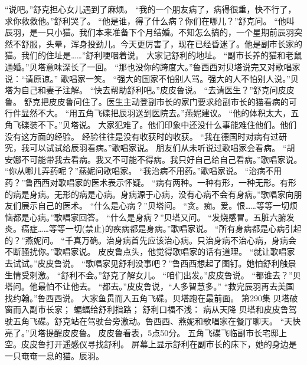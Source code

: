 \documentclass[a4paper,12pt,UTF8,twoside]{ctexbook}
\begin{document}
        “说吧。”舒克担心女儿遇到了麻烦。  
        “我的一个朋友病了，病得很重，快不行了，求你救救他。”舒利哭了。  
        “他是谁，得了什么病？你们在哪儿？”舒克问。  
        “他叫辰羽，是一只小猫。我们本来准备下个月结婚。不知怎么搞的，一个星期前辰羽突然不舒服，头晕，浑身投劲儿。今天更厉害了，现在已经昏迷了。他是副市长家的猫。我们的住址是……”舒利哽咽着说。  
        大家记舒利的地址。  
        “副市长养的猫和老鼠通婚。”贝塔意味深长了一回。  
        “那也没你的跨度大。”鲁西西对贝塔说完又对歌唱家说：“请原谅。”  
        歌唱家一笑。  
        “强大的国家不怕别人骂。强大的人不怕别人说。”贝塔为自己和妻子注解。  
        “快去帮助舒利吧。”皮皮鲁说。  
        “去请医生？”舒克问皮皮鲁。  
        舒克把皮皮鲁问住了。医生主动登副市长的家门要求给副市长的猫看病的可行件显然不大。  
        “用五角飞碟把辰羽送到医院去。”燕妮建议。  
        “他的体积太大，五角飞碟装不下。”贝塔说。  
        大家犯难了。他们印象中还没什么事能难住他们。他们没有这方面的经验。  
        经验往往是没有收获时的收获。  
        “我在德国时对病有过研究，我可以试试给辰羽看病。”歌唱家说。  
        朋友们从未听说过歌唱家会看病。  
        “胡安娜不可能带我去看病。我又不可能不得病。我只好自己给自己看病。”歌唱家说。  
        “你从哪儿弄药呢？”燕妮问歌唱家。  
        “我治病不用药。”歌唱家说。  
        “治病不用药？”鲁西西对歌唱家的医术表示怀疑。  
        “病有两种。一种有形，一种无形。有形的病是身病。无形的病是心病。身病源于心病，没有心病不会有身病。”歌唱家向朋友们展示自己的医术。  
        “什么是心病？”贝塔问。  
        “贪。痴。爱。恨……等等一切烦恼都是心病。”歌唱家回答。  
        “什么是身病？”贝塔又问。  
        “发烧感冒。五脏六腑发炎。癌症……等等一切(禁止)的疾病都是身病。”歌唱家说。        
        “所有身病都是心病引起的？”燕妮问。  
        “千真万确。治身病首先应该治心病。只治身病不治心病，身病会不断骚扰你。”歌唱家说。  
        皮皮鲁点头，他觉得歌唱家的话有道理。  
        “就让歌唱家去试试。”皮皮鲁说。  
        “歌唱家见舒利没事吧？”鲁西西想起了图钉。她怕舒利触景生情受刺激。  
        “舒利不会。”舒克了解女儿。  
        “咱们出发。”皮皮鲁说。  
        “都谁去？”贝塔问。他最怕不让他去。  
        “都去。”皮皮鲁说，“人多智慧多。”  
        “救完辰羽再去美国找约翰。”鲁西西说。  
        大家鱼贯而入五角飞碟。贝塔跑在最前面。          第290集  
        贝塔破窗而入副市长家；  
        蝙蝠给舒利指路；  
        舒利口福不浅：  
        病从天降    
        贝塔和皮皮鲁驾驶五角飞碟。舒克站在驾驶台旁激动。鲁西西、燕妮和歌唱家在餐厅聊天。  
        “天快亮了。”贝塔提醒皮皮鲁。  
        皮皮鲁看表，5点50分。  
        五角飞碟飞临副市长宅邸上空。皮皮鲁打开遥感仪寻找舒利。  
        屏幕上显示舒利在副市长的床下，她的身边是一只奄奄一息的猫。辰羽。  
\end{document}
